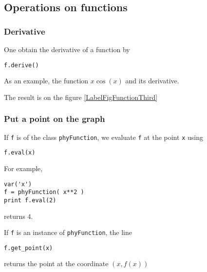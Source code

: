 \subsection{Operations on functions}

\subsubsection{Derivative}

One obtain the derivative of a function by
\begin{verbatim}
f.derive()
\end{verbatim}

As an example, the function $x\cos(x)$ and its derivative.


The result is on the figure \ref{LabelFigFunctionThird}
\newcommand{\CaptionFigFunctionThird}{A function and its derivative.}


\subsubsection{Put a point on the graph}

If \verb+f+ is of the class \verb+phyFunction+, we evaluate \verb+f+ at the point \verb+x+ using
\begin{verbatim}
f.eval(x)
\end{verbatim}
For example,
\begin{verbatim}
var('x')
f = phyFunction( x**2 )
print f.eval(2)
\end{verbatim}
returns $4$.

If \verb+f+ is an instance of \verb+phyFunction+, the line
\begin{verbatim}
f.get_point(x)
\end{verbatim}
returns the point at the coordinate $(x,f(x))$

